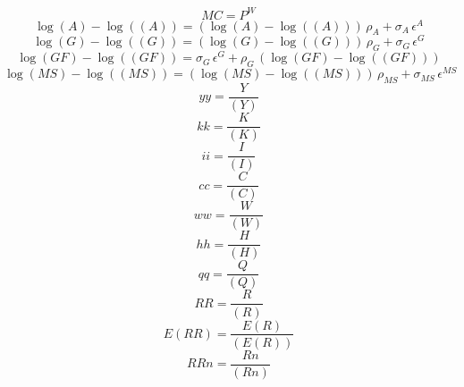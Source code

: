 \begin{dmath}
{MC}={P^{W}}
\end{dmath}
\begin{dmath}
\log\left({A}\right)-\log\left(({A})\right)=\left(\log\left({A}\right)-\log\left(({A})\right)\right)\, {{\rho_{A}}}+{{\sigma_{A}}}\, {{\epsilon^{A}}}
\end{dmath}
\begin{dmath}
\log\left({G}\right)-\log\left(({G})\right)=\left(\log\left({G}\right)-\log\left(({G})\right)\right)\, {{\rho_{G}}}+{{\sigma_{G}}}\, {{\epsilon^{G}}}
\end{dmath}
\begin{dmath}
\log\left({GF}\right)-\log\left(({GF})\right)={{\sigma_{G}}}\, {{\epsilon^{G}}}+{{\rho_{G}}}\, \left(\log\left({GF}\right)-\log\left(({GF})\right)\right)
\end{dmath}
\begin{dmath}
\log\left({MS}\right)-\log\left(({MS})\right)=\left(\log\left({MS}\right)-\log\left(({MS})\right)\right)\, {{\rho_{MS}}}+{{\sigma_{MS}}}\, {{\epsilon^{MS}}}
\end{dmath}
\begin{dmath}
{yy}=\frac{{Y}}{({Y})}
\end{dmath}
\begin{dmath}
{kk}=\frac{{K}}{({K})}
\end{dmath}
\begin{dmath}
{ii}=\frac{{I}}{({I})}
\end{dmath}
\begin{dmath}
{cc}=\frac{{C}}{({C})}
\end{dmath}
\begin{dmath}
{ww}=\frac{{W}}{({W})}
\end{dmath}
\begin{dmath}
{hh}=\frac{{H}}{({H})}
\end{dmath}
\begin{dmath}
{qq}=\frac{{Q}}{({Q})}
\end{dmath}
\begin{dmath}
{RR}=\frac{{R}}{({R})}
\end{dmath}
\begin{dmath}
{E(RR)}=\frac{{E(R)}}{({E(R)})}
\end{dmath}
\begin{dmath}
{RRn}=\frac{{Rn}}{({Rn})}
\end{dmath}
